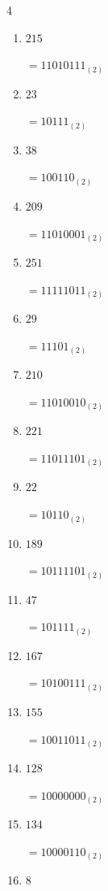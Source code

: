 \begin{multicols}{4}
\begin{enumerate}
        $=11111010_{(2)}$

  \item $215$

        $=11010111_{(2)}$

\columnbreak %

\resetques

  \item $23$

        $=10111_{(2)}$

  \item $38$

        $=100110_{(2)}$

  \item $209$

        $=11010001_{(2)}$

  \item $251$

        $=11111011_{(2)}$

  \item $29$

        $=11101_{(2)}$

  \item $210$

        $=11010010_{(2)}$

  \item $221$

        $=11011101_{(2)}$

  \item $22$

        $=10110_{(2)}$

  \item $189$

        $=10111101_{(2)}$

  \item $47$

        $=101111_{(2)}$

  \item $167$

        $=10100111_{(2)}$

  \item $155$

        $=10011011_{(2)}$

  \item $128$

        $=10000000_{(2)}$

  \item $134$

        $=10000110_{(2)}$

  \item $8$


\end{enumerate}
\end{multicols}
